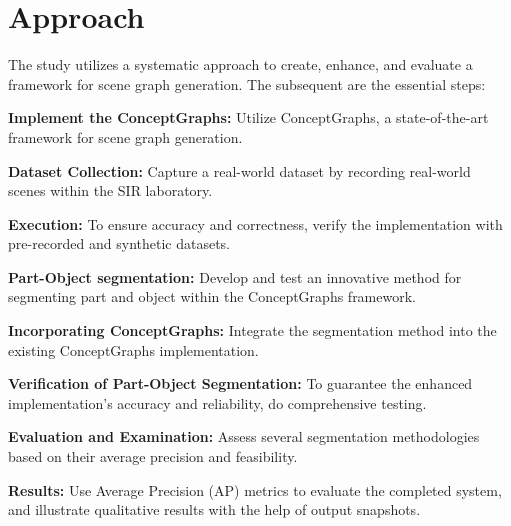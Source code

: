 \section{Approach}
The study utilizes a systematic approach to create, enhance, and evaluate a framework for scene graph generation. The subsequent are the essential steps:
\begin{compactenum}[1.]
\item \textbf{Implement the ConceptGraphs:} Utilize ConceptGraphs, a state-of-the-art framework for scene graph generation.
\item \textbf{Dataset Collection:} Capture a real-world dataset by recording real-world scenes within the SIR laboratory.
\item \textbf{Execution:} To ensure accuracy and correctness, verify the implementation with pre-recorded and synthetic datasets.
\item \textbf{Part-Object segmentation:} Develop and test an innovative method for segmenting part and object within the ConceptGraphs framework.
\item \textbf{Incorporating ConceptGraphs:} Integrate the segmentation method into the existing ConceptGraphs implementation.
\item \textbf{Verification of Part-Object Segmentation:} To guarantee the enhanced implementation's accuracy and reliability, do comprehensive testing.
\item \textbf{Evaluation and Examination: } Assess several segmentation methodologies based on their average precision and feasibility.
\item \textbf{Results: } Use Average Precision (AP) metrics to evaluate the completed system, and illustrate  qualitative results with the help of output snapshots.
\end{compactenum}